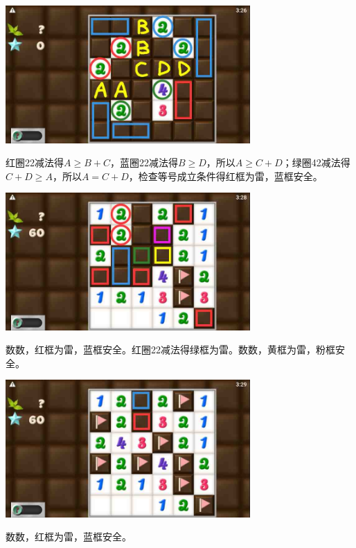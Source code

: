 \subsection{} %
\begin{center}
    \includegraphics[width=0.7\textwidth]{puzzlelow/240-1.jpg}
\end{center}
红圈22减法得$A\ge B+C$，蓝圈22减法得$B\ge D$，所以$A\ge C+D$；绿圈42减法得$C+D\ge A$，所以$A=C+D$，检查等号成立条件得红框为雷，蓝框安全。
\begin{center}
    \includegraphics[width=0.7\textwidth]{puzzlelow/240-2.jpg}
\end{center}
数数，红框为雷，蓝框安全。红圈22减法得绿框为雷。数数，黄框为雷，粉框安全。
\begin{center}
    \includegraphics[width=0.7\textwidth]{puzzlelow/240-3.jpg}
\end{center}
数数，红框为雷，蓝框安全。

